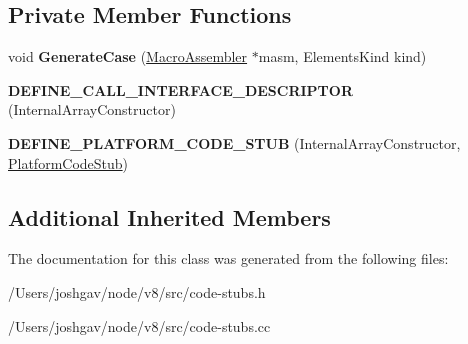 \subsection*{Private Member Functions}
\begin{DoxyCompactItemize}
\item 
void {\bfseries Generate\+Case} (\hyperlink{classv8_1_1internal_1_1_macro_assembler}{Macro\+Assembler} $\ast$masm, Elements\+Kind kind)\hypertarget{classv8_1_1internal_1_1_internal_array_constructor_stub_a687fcc75e3e2656ea50ab6a36604fe98}{}\label{classv8_1_1internal_1_1_internal_array_constructor_stub_a687fcc75e3e2656ea50ab6a36604fe98}

\item 
{\bfseries D\+E\+F\+I\+N\+E\+\_\+\+C\+A\+L\+L\+\_\+\+I\+N\+T\+E\+R\+F\+A\+C\+E\+\_\+\+D\+E\+S\+C\+R\+I\+P\+T\+OR} (Internal\+Array\+Constructor)\hypertarget{classv8_1_1internal_1_1_internal_array_constructor_stub_a36f683e5e463003450c61a330eac312d}{}\label{classv8_1_1internal_1_1_internal_array_constructor_stub_a36f683e5e463003450c61a330eac312d}

\item 
{\bfseries D\+E\+F\+I\+N\+E\+\_\+\+P\+L\+A\+T\+F\+O\+R\+M\+\_\+\+C\+O\+D\+E\+\_\+\+S\+T\+UB} (Internal\+Array\+Constructor, \hyperlink{classv8_1_1internal_1_1_platform_code_stub}{Platform\+Code\+Stub})\hypertarget{classv8_1_1internal_1_1_internal_array_constructor_stub_a61778f28efdc3a9c1652618608f56ace}{}\label{classv8_1_1internal_1_1_internal_array_constructor_stub_a61778f28efdc3a9c1652618608f56ace}

\end{DoxyCompactItemize}
\subsection*{Additional Inherited Members}


The documentation for this class was generated from the following files\+:\begin{DoxyCompactItemize}
\item 
/\+Users/joshgav/node/v8/src/code-\/stubs.\+h\item 
/\+Users/joshgav/node/v8/src/code-\/stubs.\+cc\end{DoxyCompactItemize}
